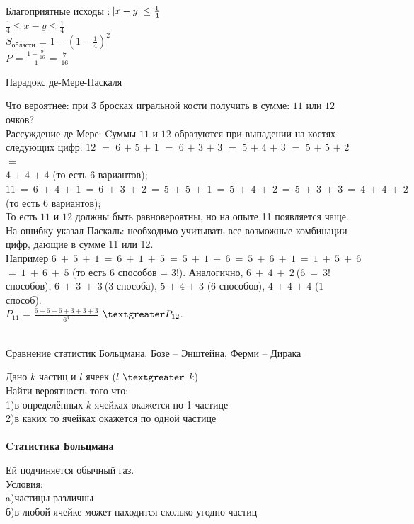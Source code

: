 \documentclass[russian, 12pt, fleqn,x11names]{article}
\begin{document}
\\Благоприятные исходы : $\abs{x - y} \leq \frac{1}{4}$\\
$\frac{1}{4} \leq x - y \leq \frac{1}{4}$\\	
$S_{области}$ = $1 - {(1 - \frac{1}{4})}^2$\\
$P$ = $\frac{1 - \frac{9}{16}}{1}$ = $\frac{7}{16}$
\begin{center}
$\textbf{Парадокс де-Мере-Паскаля }$
\end{center}
Что вероятнее: при $3$ бросках игральной кости получить в сумме: $11$ или $12$ очков?\\
Рассуждение де-Мере: Cуммы $11$ и $12$ образуются при выпадении на костях следующих цифр: $12$ $=$ $6$ $+$  $5$ $+$ $1$ $=$ $6$ $+$ $3$ $+$ $3$ $=$ $5$ $+$ $4$ $+$ $3$ $=$ $5$ $+$ $5$ $+$ $2$ $=$ \\
$4$ $+$ $4$ $+$ $4$ (то есть $6$ вариантов);\\
$11\ =\  6\ +\ 4\ +\ 1\ =\ 6\ +\ 3\ +\ 2\ =\ 5\ +\ 5\ +\ 1\ =\ 5\ +\ 4\ +\ 2\ =\ 5\ +\ 3\ +\ 3\ =\ 4\ +\ 4\ +\ 2\ $(то есть $6$ вариантов);\\
То есть $11$ и $12$ должны быть равновероятны, но на опыте 11 появляется чаще.\\
На ошибку указал Паскаль: необходимо учитывать все возможные комбинации цифр, дающие в сумме 11 или 12.\\
Например $6\ +\ 5\ +\ 1\ =\ 6\ +\ 1\ +\ 5\ =\ 5\ +\ 1\ +\ 6\ =\ 5\ +\  6\ +\ 1\ =\ 1\ +\ 5\ +\ 6$\\
$=\ 1\ +\ 6\ +\ 5$ (то есть $6$ способов = $3$!). Аналогично, $6\ +\ 4\ +\ 2\  $($6\ =\ 3!$ способов), $6\ +\ 3\ +\  3\ $($3$ способа), $5$ $+$ $4$ $+$ $3$ ($6$ способов), $4$ $+$ $4$ $+$ $4$ ($1$ способ).\\
$P_{11}$ = $\frac{6 +  6 + 6 + 3 + 3 + 3}{6^3}$  $\textgreater P_{12}$.\\
\\
\begin{center}
$\textbf{Сравнение статистик Больцмана, Бозе -- Энштейна, Ферми -- Дирака }$
\end{center}
Дано $k$ частиц и $l$ ячеек ($l$ $\textgreater$ $k$)\\
Найти вероятность того что:\\
	1)в определённых $k$ ячейках окажется по 1 частице\\
	2)в каких то ячейках окажется по одной частице\\
\\
\noindent
\textbf{Cтатистика Больцмана}
\begin{tabbing}
Ей подчиняется обычный газ.\\
Условия:\\
\qquad a)частицы различны\\
\qquad б)в любой ячейке может находится сколько угодно частиц\\
\end{tabbing}
\end{document}
